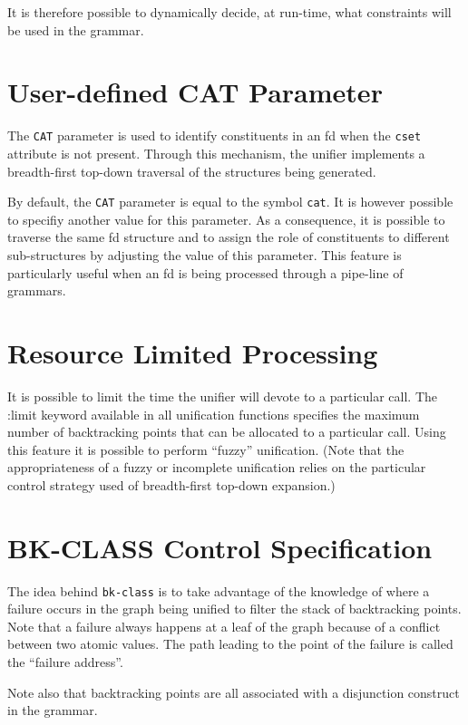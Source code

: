 \documentclass[10pt,a4paper]{report}
\begin{document}
\begin{appendices}
It is therefore possible to dynamically decide, at run-time, what
constraints will be used in the grammar.


\section{User-defined CAT Parameter}

The {\tt CAT} parameter is used to identify constituents in an fd when the
{\tt cset} attribute is not present.  Through this mechanism, the unifier
implements a breadth-first top-down traversal of the structures being
generated.  

By default, the {\tt CAT} parameter is equal to the symbol {\tt cat}.  It is
however possible to specifiy another value for this parameter.  As a
consequence, it is possible to traverse the same fd structure and to assign
the role of constituents to different sub-structures by adjusting the value
of this parameter.  This feature is particularly useful when an fd is being
processed through a pipe-line of grammars.


\section{Resource Limited Processing}

It is possible to limit the time the unifier will devote to a particular
call.  The :limit keyword available in all unification functions specifies
the maximum number of backtracking points that can be allocated to a
particular call.  Using this feature it is possible to perform ``fuzzy''
unification.  (Note that the appropriateness of a fuzzy or incomplete
unification relies on the particular control strategy used of breadth-first
top-down expansion.)


\section{BK-CLASS Control Specification}

The idea behind {\tt bk-class} is to take advantage of the knowledge of where
a failure occurs in the graph being unified to filter the stack of
backtracking points.  Note that a failure always happens at a leaf of the
graph because of a conflict between two atomic values.  The path leading to
the point of the failure is called the ``failure address''.

Note also that backtracking points are all associated with a disjunction
construct in the grammar.


\end{appendices}
\end{document}
